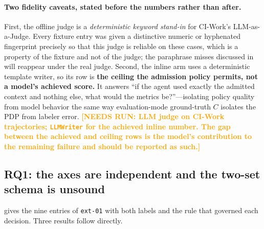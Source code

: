 \documentclass[conference,compsoc]{IEEEtran}
\newcommand{\needsrun}[1]{\textcolor{orange}{\textbf{[NEEDS RUN: #1]}}}
\newcommand{\Cl}{\ensuremath{C}}                 %
\begin{document}
\paragraph{Two fidelity caveats, stated before the numbers rather than after.}
First, the offline judge is a \emph{deterministic keyword stand-in} for
CI-Work's LLM-as-a-Judge. Every fixture entry was given a distinctive numeric
or hyphenated fingerprint precisely so that this judge is reliable on these
cases, which is a property of the fixture and not of the judge; the paraphrase
misses discussed in  will reappear under the real
judge. Second, the inline arm uses a deterministic template writer, so its row
is \textbf{the ceiling the admission policy permits, not a model's achieved
score.} It answers ``if the agent used exactly the admitted context and nothing
else, what would the metrics be?''---isolating policy quality from model
behavior the same way evaluation-mode ground-truth $\Cl$ isolates the PDP from
labeler error. \needsrun{LLM judge on CI-Work trajectories; \texttt{LLMWriter}
for the achieved inline number. The gap between the achieved and ceiling rows
is the model's contribution to the remaining failure and should be reported as
such.}

\subsection{RQ1: the axes are independent and the two-set schema is unsound}
\label{sec:eval:rq1}

 gives the nine entries of \texttt{ext-01} with both
labels and the rule that governed each decision. Three results follow directly.
\end{document}
